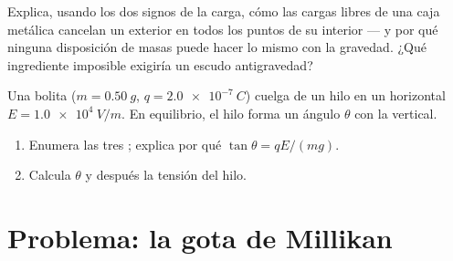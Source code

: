 \begin{exercise}[$\star\star\star$]\label{exo:g11:electric-gravitational-fields:14}
Explica, usando los dos signos de la carga, cómo las cargas libres de
una caja metálica cancelan un  exterior en todos los
puntos de su interior --- y por qué ninguna disposición de masas puede
hacer lo mismo con la gravedad. ¿Qué ingrediente imposible exigiría un
escudo antigravedad?
\end{exercise}

\begin{exercise}[$\star\star\star$]\label{exo:g11:electric-gravitational-fields:15}
Una bolita ($m = \qty{0.50}{g}$, $q = \qty{+2.0e-7}{C}$) cuelga de un
hilo en un  horizontal $E = \qty{1.0e4}{V/m}$. En
equilibrio, el hilo forma un ángulo $\theta$ con la vertical.
\begin{enumerate}
  \item Enumera las tres ; explica por qué
        $\tan\theta = qE / (mg)$.
  \item Calcula $\theta$ y después la tensión del hilo.
\end{enumerate}
\end{exercise}

\section{Problema: la gota de Millikan}

